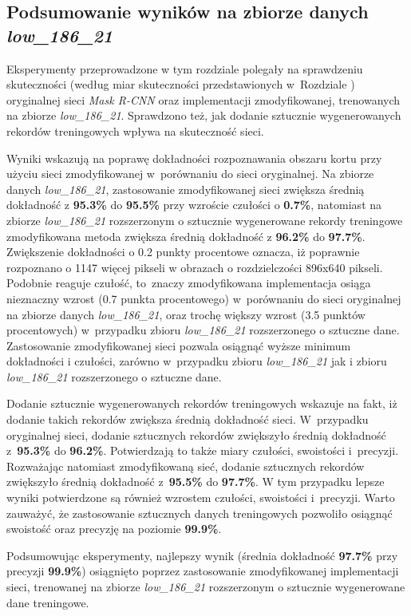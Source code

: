 \subsection{Podsumowanie wyników na zbiorze danych \textit{low\_186\_21}}
Eksperymenty przeprowadzone w tym rozdziale polegały na sprawdzeniu skuteczności (według miar skuteczności przedstawionych w~Rozdziale ) oryginalnej sieci \textit{Mask R-CNN} oraz implementacji zmodyfikowanej, trenowanych na zbiorze \textit{low\_186\_21}.
Sprawdzono też, jak dodanie sztucznie wygenerowanych rekordów treningowych wpływa na skuteczność sieci.


Wyniki wskazują na poprawę dokładności rozpoznawania obszaru kortu przy użyciu sieci zmodyfikowanej w~porównaniu do sieci oryginalnej.
Na zbiorze danych \textit{low\_186\_21}, zastosowanie zmodyfikowanej sieci zwiększa średnią dokładność z \textbf{95.3\%} do \textbf{95.5\%} przy wzroście czułości o \textbf{0.7\%}, natomiast na zbiorze \textit{low\_186\_21} rozszerzonym o sztucznie wygenerowane rekordy treningowe zmodyfikowana metoda zwiększa średnią dokładność z \textbf{96.2\%} do \textbf{97.7\%}. Zwiększenie dokładności o 0.2 punkty procentowe oznacza, iż poprawnie rozpoznano o 1147 więcej pikseli w obrazach o rozdzielczości 896x640 pikseli.
Podobnie reaguje czułość, to~znaczy zmodyfikowana implementacja osiąga nieznaczny wzrost (0.7 punkta procentowego) w~porównaniu do sieci oryginalnej na zbiorze danych \textit{low\_186\_21}, oraz trochę większy wzrost (3.5 punktów procentowych) w~przypadku zbioru \textit{low\_186\_21} rozszerzonego o sztuczne dane. Zastosowanie zmodyfikowanej sieci pozwala osiągnąć wyższe minimum dokładności i czułości, zarówno w~przypadku zbioru \textit{low\_186\_21} jak i zbioru \textit{low\_186\_21} rozszerzonego o sztuczne dane.


Dodanie sztucznie wygenerowanych rekordów treningowych wskazuje na fakt, iż dodanie takich rekordów zwiększa średnią dokładność sieci. W~przypadku oryginalnej sieci, dodanie sztucznych rekordów zwiększyło średnią dokładność z~\textbf{95.3\%} do \textbf{96.2\%}. Potwierdzają to także miary czułości, swoistości i~precyzji. Rozważając natomiast zmodyfikowaną sieć, dodanie sztucznych rekordów zwiększyło średnią dokładność z~\textbf{95.5\%} do \textbf{97.7\%}. W tym przypadku lepsze wyniki potwierdzone są również wzrostem czułości, swoistości i~precyzji. Warto zauważyć, że zastosowanie sztucznych danych treningowych pozwoliło osiągnąć swoistość oraz precyzję na poziomie \textbf{99.9\%}.


Podsumowując eksperymenty, najlepszy wynik (średnia dokładność \textbf{97.7\%} przy precyzji \textbf{99.9\%}) osiągnięto poprzez zastosowanie zmodyfikowanej implementacji sieci, trenowanej na zbiorze \textit{low\_186\_21} rozszerzonym o sztucznie wygenerowane dane treningowe.
